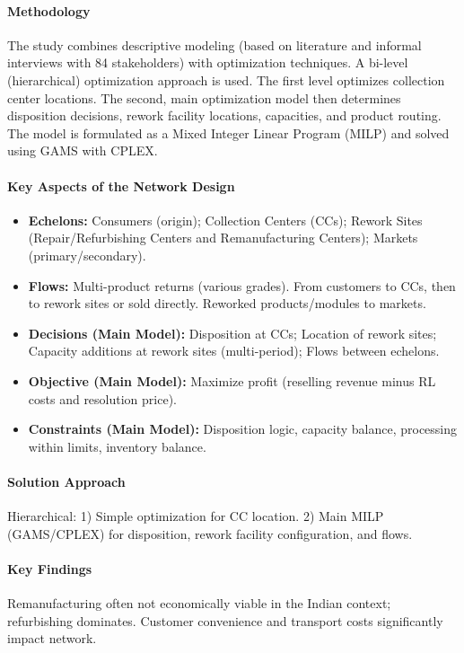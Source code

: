 \paragraph{Methodology} The study combines descriptive modeling (based on literature and informal interviews with 84 stakeholders) with optimization techniques. A bi-level (hierarchical) optimization approach is used. The first level optimizes collection center locations. The second, main optimization model then determines disposition decisions, rework facility locations, capacities, and product routing. The model is formulated as a Mixed Integer Linear Program (MILP) and solved using GAMS with CPLEX.
\paragraph{Key Aspects of the Network Design}
\begin{itemize}
    \item \textbf{Echelons:} Consumers (origin); Collection Centers (CCs); Rework Sites (Repair/Refurbishing Centers and Remanufacturing Centers); Markets (primary/secondary).
    \item \textbf{Flows:} Multi-product returns (various grades). From customers to CCs, then to rework sites or sold directly. Reworked products/modules to markets.
    \item \textbf{Decisions (Main Model):} Disposition at CCs; Location of rework sites; Capacity additions at rework sites (multi-period); Flows between echelons.
    \item \textbf{Objective (Main Model):} Maximize profit (reselling revenue minus RL costs and resolution price).
    \item \textbf{Constraints (Main Model):} Disposition logic, capacity balance, processing within limits, inventory balance.
\end{itemize}
\paragraph{Solution Approach} Hierarchical: 1) Simple optimization for CC location. 2) Main MILP (GAMS/CPLEX) for disposition, rework facility configuration, and flows.
\paragraph{Key Findings} Remanufacturing often not economically viable in the Indian context; refurbishing dominates. Customer convenience and transport costs significantly impact network.
